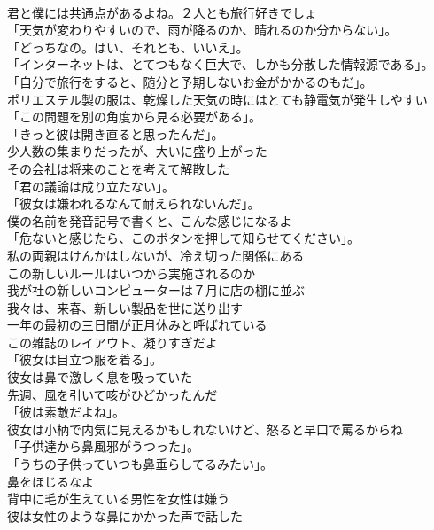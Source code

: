 \documentclass[8pt]{extreport}
\begin{document}
\begin{CJK}{UTF8}{min}
\\	君と僕には共通点があるよね。２人とも旅行好きでしょ	
\\	「天気が変わりやすいので、雨が降るのか、晴れるのか分からない」。	
\\	「どっちなの。はい、それとも、いいえ」。	
\\	「インターネットは、とてつもなく巨大で、しかも分散した情報源である」。	
\\	「自分で旅行をすると、随分と予期しないお金がかかるのもだ」。	
\\	ポリエステル製の服は、乾燥した天気の時にはとても静電気が発生しやすい	
\\	「この問題を別の角度から見る必要がある」。	
\\	「きっと彼は開き直ると思ったんだ」。	
\\	少人数の集まりだったが、大いに盛り上がった	
\\	その会社は将来のことを考えて解散した	
\\	「君の議論は成り立たない」。	
\\	「彼女は嫌われるなんて耐えられないんだ」。	
\\	僕の名前を発音記号で書くと、こんな感じになるよ	
\\	「危ないと感じたら、このボタンを押して知らせてください」。	
\\	私の両親はけんかはしないが、冷え切った関係にある	
\\	この新しいルールはいつから実施されるのか	
\\	我が社の新しいコンピューターは７月に店の棚に並ぶ	
\\	我々は、来春、新しい製品を世に送り出す	
\\	一年の最初の三日間が正月休みと呼ばれている	
\\	この雑誌のレイアウト、凝りすぎだよ	
\\	「彼女は目立つ服を着る」。	
\\	彼女は鼻で激しく息を吸っていた	
\\	先週、風を引いて咳がひどかったんだ	
\\	「彼は素敵だよね」。	
\\	彼女は小柄で内気に見えるかもしれないけど、怒ると早口で罵るからね	
\\	「子供達から鼻風邪がうつった」。	
\\	「うちの子供っていつも鼻垂らしてるみたい」。	
\\	鼻をほじるなよ	
\\	背中に毛が生えている男性を女性は嫌う	
\\	彼は女性のような鼻にかかった声で話した	

\end{CJK}
\end{document}
